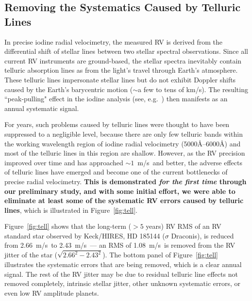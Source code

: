 \documentclass[12pt]{article}
\def\mps{m/s}
\def\keck{Keck/HIRES}
\begin{document}
\vspace{-3pt}
\subsection{Removing the Systematics Caused by Telluric
  Lines}\label{sec:tell}

In precise iodine radial velocimetry, the measured RV is derived from
the differential shift of stellar lines between two stellar spectral
observations. Since all current RV instruments are ground-based, the
stellar spectra inevitably contain telluric absorption lines as
from the light's travel through Earth's atmosphere. These telluric lines
impersonate stellar lines but do not exhibit Doppler shifts caused by the
Earth's barycentric motion ($\sim$a few to tens of k\mps). The
resulting ``peak-pulling" effect in the iodine analysis (see,
e.g.~\citealt{wright2013}) then manifests as an annual systematic signal.

For years, such problems caused by telluric lines were thought to have
been suppressed to a negligible level, because there are only few
telluric bands within the working wavelength region of iodine radial
velocimetry (5000\AA--6000\AA) and most of the telluric lines in this
region are shallow. However, as the RV precision improved over time
and has approached $\sim1$~\mps\ and better, the adverse effects of
telluric lines have emerged and become one of the current bottlenecks
of precise radial velocimetry. \textbf{This is demonstrated
  \textit{for the first time} through our preliminary study, and with
  some initial effort, we were able to eliminate at least some of the
  systematic RV errors caused by telluric lines}, which is illustrated
in Figure~\ref{fig:tell}.

Figure~\ref{fig:tell} shows that the long-term ($> 5$ years) RV RMS of
an RV standard star observed by \keck, HD 185144 ($\sigma$ Draconis),
is reduced from 2.66~\mps\ to 2.43~\mps\ --- an RMS of 1.08~\mps\ is
removed from the RV jitter of the star ($\sqrt{2.66^2-2.43^2}$). The
bottom panel of Figure~\ref{fig:tell} illustrates the systematic
errors that are being removed, which is a clear annual signal. The rest
of the RV jitter may be due to residual telluric line effects not
removed completely, intrinsic stellar jitter, other unknown systematic
errors, or even low RV amplitude planets. 
\end{document}
